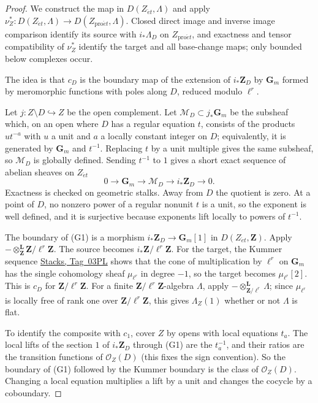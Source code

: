\documentclass[11pt,a4paper]{article}
\numberwithin{equation}{section}
\theoremstyle{definition}
\theoremstyle{remark}
\newcommand{\et}{\acute{e}t}
\newcommand{\proet}{\mathrm{pro}\acute{e}t}
\newcommand{\stacks}[1]{\href{https://stacks.math.columbia.edu/tag/#1}{\textnormal{Stacks, Tag~#1}}}
\begin{document}
\begin{proof}
We construct the map in $D(Z_{\et},\Lambda)$ and apply
$\nu_Z^*\colon D(Z_{\et},\Lambda)\to D(Z_{\proet},\Lambda)$. Closed direct
image and inverse image comparison identify its source with
$i_*\Lambda_D$ on $Z_{\proet}$, and exactness and tensor compatibility
of $\nu_Z^*$ identify the target and all base-change maps; only
bounded below complexes occur.

The idea is that \(c_D\) is the boundary map of the extension of
\(i_*\mathbf Z_D\) by \(\mathbf G_m\) formed by meromorphic functions
with poles along \(D\), reduced modulo \(\ell^r\).

Let \(j:Z\setminus D\hookrightarrow Z\) be the open complement. Let
\(\mathcal M_D\subset j_*\mathbf G_m\) be the subsheaf which, on an open
where \(D\) has a regular equation \(t\), consists of the products
\(ut^{-a}\) with \(u\) a unit and \(a\) a locally constant integer on
\(D\); equivalently, it is generated by \(\mathbf G_m\) and \(t^{-1}\).
Replacing \(t\) by a unit multiple gives the same subsheaf, so
\(\mathcal M_D\) is globally defined. Sending \(t^{-1}\) to \(1\) gives
a short exact sequence of abelian sheaves on \(Z_{\et}\)
\[
 0\longrightarrow\mathbf G_m\longrightarrow \mathcal M_D
   \longrightarrow i_*\mathbf Z_D\longrightarrow0.       \tag{G1}
\]
Exactness is checked on geometric stalks. Away from \(D\) the quotient
is zero. At a point of \(D\), no nonzero power of a regular nonunit
\(t\) is a unit, so the exponent is well defined, and it is surjective
because exponents lift locally to powers of \(t^{-1}\).

The boundary of (G1) is a morphism \(i_*\mathbf Z_D\to\mathbf G_m[1]\)
in \(D(Z_{\et},\mathbf Z)\).
Apply \(-\otimes^{\mathbf L}_{\mathbf Z}\mathbf Z/\ell^r\mathbf Z\). The
source becomes \(i_*\mathbf Z/\ell^r\mathbf Z\). For the target, the
Kummer sequence \stacks{03PL} shows that the cone of multiplication by
\(\ell^r\) on \(\mathbf G_m\) has the single cohomology sheaf
\(\mu_{\ell^r}\) in degree \(-1\), so the target becomes
\(\mu_{\ell^r}[2]\). This is \(c_D\) for \(\mathbf Z/\ell^r\mathbf Z\).
For a finite \(\mathbf Z/\ell^r\mathbf Z\)-algebra \(\Lambda\), apply
\(-\otimes^{\mathbf L}_{\mathbf Z/\ell^r}\Lambda\); since
\(\mu_{\ell^r}\) is locally free of rank one over
\(\mathbf Z/\ell^r\mathbf Z\), this gives \(\Lambda_Z(1)\) whether or not
\(\Lambda\) is flat.

To identify the composite with \(c_1\), cover \(Z\) by opens with local
equations \(t_a\). The local lifts of the section \(1\) of
\(i_*\mathbf Z_D\) through (G1) are the \(t_a^{-1}\), and their ratios
are the transition functions of \(\mathcal O_Z(D)\) (this fixes the
sign convention). So the boundary of (G1) followed by the Kummer
boundary is the class of \(\mathcal O_Z(D)\). Changing a local equation
multiplies a lift by a unit and changes the cocycle by a coboundary.


\end{proof}
\end{document}
